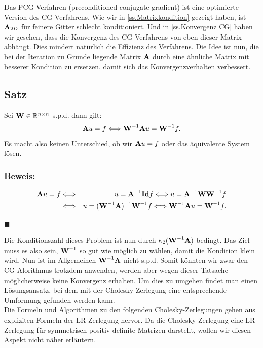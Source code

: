 Das PCG-Verfahren (preconditioned conjugate gradient) ist eine optimierte Version des CG-Verfahrens. Wie wir in \autoref{ss.Matrixkondition} gezeigt haben, ist ${\textbf{A}}_{2D}$ für feinere Gitter schlecht konditioniert. Und in \autoref{ss.Konvergenz CG} haben wir gesehen, dass die Konvergenz des CG-Verfahrens von eben dieser Matrix abhängt. Dies mindert natürlich die Effizienz des Verfahrens. Die Idee ist nun, die bei der Iteration zu Grunde liegende Matrix ${\textbf{A}}$ durch eine ähnliche Matrix mit besserer Kondition zu ersetzen, damit sich das Konvergenzverhalten verbessert.

\subsection{Satz}

Sei ${\textbf{W}} \in \mathbb{R}^{n \times n}$ s.p.d. dann gilt:
\begin{equation}
{\textbf{A}}u = f \Longleftrightarrow {\textbf{W}}^{-1} {\textbf{A}} u = {\textbf{W}}^{-1} f.
\end{equation}
Es macht also keinen Unterschied, ob wir ${\textbf{A}}u = f$ oder das äquivalente System lösen.

\subsubsection{Beweis:}

\begin{eqnarray}
{\textbf{A}}u = f &\Longleftrightarrow& u = {\textbf{A}}^{-1} {\textbf{Id}} f \Longleftrightarrow u = {\textbf{A}}^{-1} {\textbf{W}} {\textbf{W}}^{-1} f \notag \\
&\Longleftrightarrow& u = ({\textbf{W}}^{-1} {\textbf{A}})^{-1} {\textbf{W}}^{-1} f \Longleftrightarrow {\textbf{W}}^{-1} {\textbf{A}} u = {\textbf{W}}^{-1} f. \notag
\end{eqnarray}
\begin{flushright}
$\blacksquare$
\end{flushright}

Die Konditionszahl dieses Problem ist nun durch $\kappa_{2}({\textbf{W}}^{-1}{\textbf{A}})$ bedingt. Das Ziel muss es also sein, ${\textbf{W}}^{-1}$ so gut wie möglich zu wählen, damit die Kondition klein wird. Nun ist im Allgemeinen ${\textbf{W}}^{-1}{\textbf{A}}$ nicht s.p.d. Somit könnten wir zwar den CG-Alorithmus trotzdem anwenden, werden aber wegen dieser Tatsache möglicherweise keine Konvergenz erhalten. Um dies zu umgehen findet man einen Lösungsansatz, bei dem mit der Cholesky-Zerlegung eine entsprechende Umformung gefunden werden kann.\\
Die Formeln und Algorithmen zu den folgenden Cholesky-Zerlegungen gehen aus expliziten Formeln der LR-Zerlegung hervor. Da die Cholesky-Zerlegung eine LR-Zerlegung für symmetrisch positiv definite Matrizen darstellt, wollen wir diesen Aspekt nicht näher erläutern.

